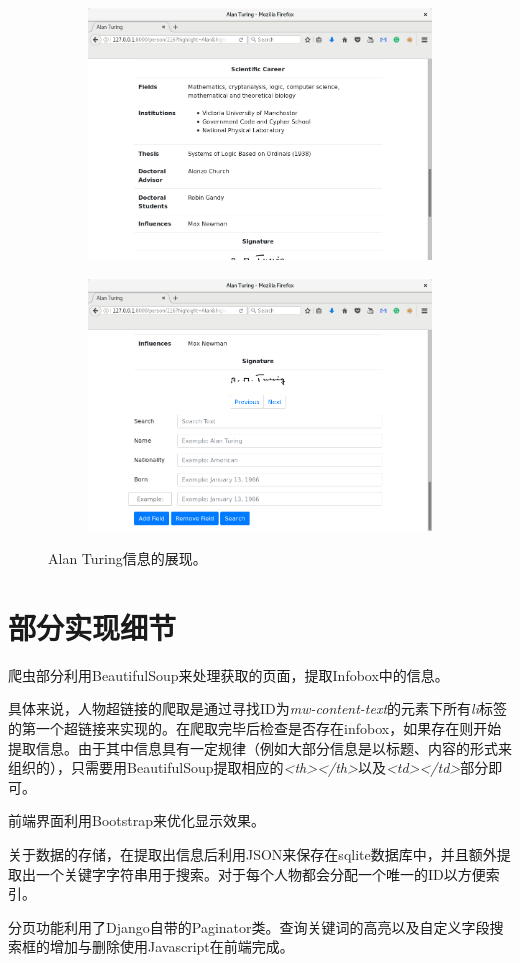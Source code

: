 \documentclass[11pt,a4paper]{article}
\begin{document}
\begin{figure}[H]
\begin{subfigure}{.49\textwidth}
		\includegraphics[width=\linewidth]{turing-3.png}
	\end{subfigure}
	\hfill
	\begin{subfigure}{.49\textwidth}
		\centering
		\includegraphics[width=\linewidth]{turing-4.png}
	\end{subfigure}
	\caption{Alan Turing信息的展现。}
\end{figure}

\section{部分实现细节}
爬虫部分利用BeautifulSoup来处理获取的页面，提取Infobox中的信息。

具体来说，人物超链接的爬取是通过寻找ID为{\it mw-content-text}的元素下所有{\it li}标签的第一个超链接来实现的。在爬取完毕后检查是否存在infobox，如果存在则开始提取信息。由于其中信息具有一定规律（例如大部分信息是以标题、内容的形式来组织的），只需要用BeautifulSoup提取相应的{\it <th></th>}以及{\it <td></td>}部分即可。

前端界面利用Bootstrap来优化显示效果。

关于数据的存储，在提取出信息后利用JSON来保存在sqlite数据库中，并且额外提取出一个关键字字符串用于搜索。对于每个人物都会分配一个唯一的ID以方便索引。

分页功能利用了Django自带的Paginator类。查询关键词的高亮以及自定义字段搜索框的增加与删除使用Javascript在前端完成。
\end{document}
